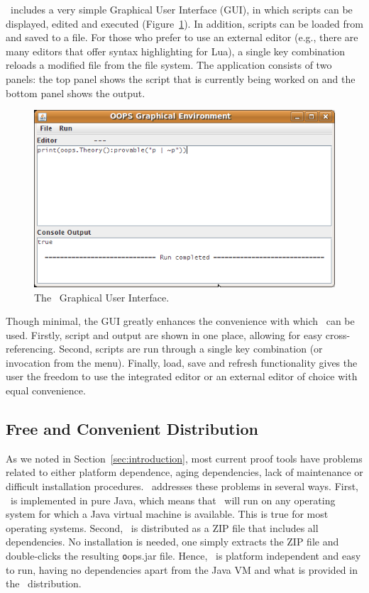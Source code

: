 \oops\ includes a very simple Graphical User Interface (GUI), in which scripts
can be displayed, edited and executed (Figure~\ref{fig:gui}). In addition,
scripts can be loaded from and saved to a file. For those who prefer to use an
external editor (e.g., there are many editors that offer syntax highlighting
for Lua), a single key combination reloads a modified file from the
file system. The application consists of two panels: the top panel shows the
script that is currently being worked on and the bottom panel shows the
output.

\begin{figure}
\centering
\includegraphics[scale=.55]{images/gui}
\caption{The \oops\ Graphical User Interface.}
\label{fig:gui}
\end{figure}

Though minimal, the GUI greatly enhances the convenience with which \oops\ can
be used. Firstly, script and output are shown in one place, allowing for easy
cross-referencing. Second, scripts are run through a single key combination
(or invocation from the menu). Finally, load, save and refresh functionality
gives the user the freedom to use the integrated editor or an external editor
of choice with equal convenience.

\subsection{Free and Convenient Distribution}

As we noted in Section~\ref{sec:introduction}, most current proof tools have
problems related to either platform dependence, aging dependencies, lack of
maintenance or difficult installation procedures. \oops\ addresses these
problems in several ways. First, \oops\ is implemented in pure Java, which
means that \oops\ will run on any operating system for which a Java virtual
machine is available. This is true for most operating systems. Second, \oops\
is distributed as a ZIP file that includes all dependencies. No installation
is needed, one simply extracts the ZIP file and double-clicks the resulting
{\texttt oops.jar} file. Hence, \oops\ is platform independent and easy to
run, having no dependencies apart from the Java VM and what is provided in the
\oops\ distribution.

